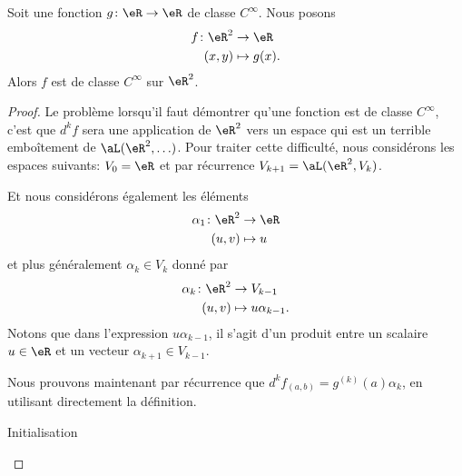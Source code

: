 \begin{lemma}       \label{LEMooDDUZooLwXkRp}
    Soit une fonction \( g\colon \eR\to \eR\) de classe \(  C^{\infty}\). Nous posons
    \begin{equation}
        \begin{aligned}
            f\colon \eR^2&\to \eR \\
            (x,y)&\mapsto g(x). 
        \end{aligned}
    \end{equation}
    Alors \( f\) est de classe \(  C^{\infty}\) sur \( \eR^2\).
\end{lemma}

\begin{proof}
    Le problème lorsqu'il faut démontrer qu'une fonction est de classe \(  C^{\infty}\), c'est que \( d^kf\) sera une application de \( \eR^2\) vers un espace qui est un terrible emboîtement de \( \aL(\eR^2,\ldots)\). Pour traiter cette difficulté, nous considérons les espaces suivants: \( V_0=\eR\) et par récurrence \( V_{k+1}=\aL(\eR^2,V_k)\). 

    Et nous considérons également les éléments
    \begin{equation}
        \begin{aligned}
            \alpha_1\colon \eR^2&\to \eR \\
            (u,v)&\mapsto u 
        \end{aligned}
    \end{equation}
    et plus généralement \( \alpha_k\in V_k\) donné par
    \begin{equation}
        \begin{aligned}
            \alpha_k\colon \eR^2&\to V_{k-1} \\
            (u,v)&\mapsto u\alpha_{k-1}. 
        \end{aligned}
    \end{equation}
    Notons que dans l'expression \( u\alpha_{k-1}\), il s'agit d'un produit entre un scalaire \( u\in \eR\) et un vecteur \( \alpha_{k+1}\in V_{k-1}\).

    Nous prouvons maintenant par récurrence que \( d^{k}f_{(a,b)}=g^{(k)}(a)\alpha_k\), en utilisant directement la définition.

    \begin{subproof}
        \item[Initialisation]


\end{subproof}
\end{proof}
